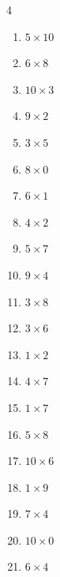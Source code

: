 \begin{multicols}{4}
\begin{enumerate}
  \item $5\times 10$
        \phantom{$=50$}

  \item $6\times 8$
        \phantom{$=48$}

  \item $10\times 3$
        \phantom{$=30$}

  \item $9\times 2$
        \phantom{$=18$}

  \item $3\times 5$
        \phantom{$=15$}

  \item $8\times 0$
        \phantom{$=0$}

  \item $6\times 1$
        \phantom{$=6$}

  \item $4\times 2$
        \phantom{$=8$}

  \item $5\times 7$
        \phantom{$=35$}

  \item $9\times 4$
        \phantom{$=36$}

  \item $3\times 8$
        \phantom{$=24$}

  \item $3\times 6$
        \phantom{$=18$}

  \item $1\times 2$
        \phantom{$=2$}

  \item $4\times 7$
        \phantom{$=28$}

  \item $1\times 7$
        \phantom{$=7$}

  \item $5\times 8$
        \phantom{$=40$}

  \item $10\times 6$
        \phantom{$=60$}

  \item $1\times 9$
        \phantom{$=9$}

  \item $7\times 4$
        \phantom{$=28$}

  \item $10\times 0$
        \phantom{$=0$}

  \item $6\times 4$
        \phantom{$=24$}


\end{enumerate}
\end{multicols}
